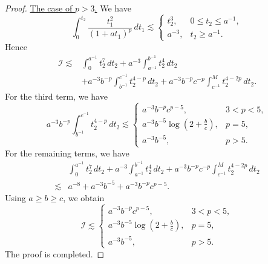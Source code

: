 \documentclass[10pt,a4paper]{amsart}
\begin{document}
\begin{proof}
\underline{The case of \(p>3\).} We have 
\[
\int_0^{t_2}\frac{t_1^2}{(1+at_1)^p}\,dt_1
\lesssim
\begin{cases}
t_2^3, & 0\le t_2\le a^{-1},\\[1mm]
a^{-3}, & t_2\ge a^{-1}.
\end{cases}
\]
Hence
\begin{align*}
\mathcal I
\lesssim & 
\int_0^{a^{-1}} t_2^7\,dt_2
+a^{-3}\int_{a^{-1}}^{b^{-1}} t_2^4\,dt_2
 \\
&+a^{-3}b^{-p}\int_{b^{-1}}^{c^{-1}} t_2^{4-p}\,dt_2+a^{-3}b^{-p}c^{-p}\int_{c^{-1}}^M t_2^{4-2p}\,dt_2.
\end{align*}
For the third term, we have 
\[
a^{-3}b^{-p}\int_{b^{-1}}^{c^{-1}} t_2^{4-p}\,dt_2
\lesssim
\begin{cases}
a^{-3}b^{-p}c^{p-5}, & 3<p<5,\\[1mm]
a^{-3}b^{-5}\log\left(2+\frac bc\right), & p=5,\\[1mm]
a^{-3}b^{-5}, & p>5.
\end{cases}
\]
For the remaining terms, we have 
\begin{align*}
    & \int_0^{a^{-1}} t_2^7\,dt_2
+a^{-3}\int_{a^{-1}}^{b^{-1}} t_2^4\,dt_2
 +a^{-3}b^{-p}c^{-p}\int_{c^{-1}}^M t_2^{4-2p}\,dt_2 \\ 
 \lesssim & a^{-8}+a^{-3}b^{-5}+a^{-3}b^{-p}c^{p-5}. 
\end{align*}
Using $a\geq b\geq c$, we obtain
\[
\mathcal I\lesssim
\begin{cases}
a^{-3}b^{-p}c^{p-5}, & 3<p<5,\\[1mm]
a^{-3}b^{-5}\log\left(2+\frac bc\right), & p=5,\\[1mm]
a^{-3}b^{-5}, & p>5.
\end{cases}
\]
The proof is completed. 
\end{proof}
\end{document}
